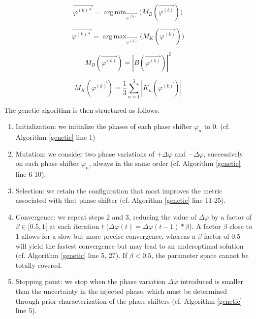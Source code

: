 \documentclass{aa}
\DeclareMathOperator*{\argmax}{arg\,max}
\DeclareMathOperator*{\argmin}{arg\,min}
\begin{document}
            \begin{equation}
                \vec{\varphi^{(b)*}} = \argmin_{\vec{\varphi^{(b)}}} \Big( M_B(\vec{\varphi^{(b)}}) \Big)
            \end{equation}
    
            \begin{equation}
                \vec{\varphi^{(k)*}} = \argmax_{\vec{\varphi^{(k)}}} \Big( M_K(\vec{\varphi^{(k)}}) \Big)
            \end{equation}
    
            \begin{equation}
                M_B(\vec{\varphi^{(b)}}) = |B(\vec{\varphi^{(b)}})|^2
            \end{equation}
    
            \begin{equation}
                M_K(\vec{\varphi^{(k)}}) = \frac{1}{3}\sum_{n=1}^3 |K_n(\vec{\varphi^{(k)}})|
            \end{equation}
    
            The genetic algorithm is then structured as follows.
    
            \begin{enumerate}
                \item Initialization: we initialize the phases of each phase shifter $\varphi_n$ to 0.  (cf. Algorithm \ref{genetic} line 1)
                \item Mutation: we consider two phase variations of $+ \Delta \varphi$ and $- \Delta \varphi$, successively on each phase shifter $\varphi_n$, always in the same order  (cf. Algorithm \ref{genetic} line 6-10).
                \item Selection: we retain the configuration that most improves the metric associated with that phase shifter (cf. Algorithm \ref{genetic} line 11-25). 
                \item Convergence: we repeat steps 2 and 3, reducing the value of $\Delta \varphi$ by a factor of $\beta \in [0.5,1[$ at each iteration $t$ ($\Delta \varphi(t) = \Delta \varphi(t-1) * \beta$). A factor $\beta$ close to $1$ allows for a slow but more precise convergence, whereas a $\beta$ factor of $0.5$ will yield the fastest convergence but may lead to an underoptimal solution (cf. Algorithm \ref{genetic} line 5, 27). If $\beta < 0.5$, the parameter space cannot be totally covered.
                \item Stopping point: we stop when the phase variation $\Delta \varphi$ introduced is smaller than the uncertainty in the injected phase, which must be determined through prior characterization of the phase shifters (cf. Algorithm \ref{genetic} line 5).
            \end{enumerate}
    
\end{document}
